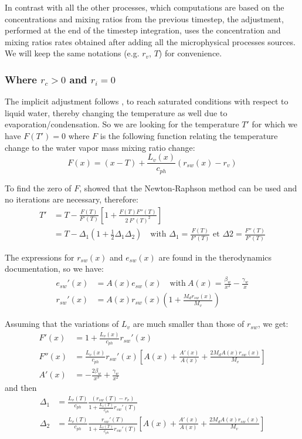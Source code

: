 In contrast with all the other processes, which computations are based on the concentrations and mixing ratios from the previous timestep, the adjustment, performed at the end of the timestep integration, uses the concentration and mixing ratios rates obtained after adding all the microphysical processes sources. We will keep the same notations (e.g. $r_v$, $T$) for convenience.

\subsubsection{Where $r_c>0$ and $r_i=0$}

The implicit adjustment follows \citet{Langlois1973}, to reach saturated conditions with respect to liquid water, thereby changing the temperature as well due to evaporation/condensation. So we are looking for the temperature $T'$ for which we have $F(T')=0$ where $F$ is the following function relating the temperature change to the water vapor mass mixing ratio change:
\begin{equation}
 F(x) = (x-T) + \frac{L_v(x)}{c_{ph}} (r_{sw}(x)-r_v)
\end{equation}

To find the zero of $F$, \citet{Langlois1973} showed that the Newton-Raphson method can be used and no iterations are necessary, therefore:
\begin{align}
 T' &= T - \frac{F(T)}{F'(T)} [1 + \frac{F(T) F''(T)}{2 ~ F'(T)^2} ] \\
 &= T - \Delta_1 \left( 1 + \frac{1}{2} \Delta_1 \Delta_2 \right) \quad \text{with } \Delta_1 = \frac{F(T)}{F'(T)} \text{ et } \Delta2 = \frac{F''(T)}{F'(T)}
\end{align}

The expressions for $r_{sw}(x)$ and $e_{sw}(x)$ are found in the therodynamics documentation, so we have:
\begin{align}
 e_{sw}'(x) &= A(x) e_{sw}(x) \quad \mathrm{with~} A(x) = \frac{\beta_w}{x^2} - \frac{\gamma_w}{x} \\
 r_{sw}'(x) &= A(x) r_{sw}(x) (1 + \frac{M_d r_{sw}(x)}{M_v} )
\end{align}

Assuming that the variations of $L_v$ are much smaller than those of $r_{sw}$, we get:
\begin{align}
 F'(x) &= 1 + \frac{L_v(x)}{c_{ph}} r_{sw}'(x) \\
 F''(x) &= \frac{L_v(x)}{c_{ph}} r_{sw}'(x) \left[ A(x) + \frac{A'(x)}{A(x)} + \frac{2 M_d A(x) r_{sw}(x)}{M_v} \right] \\
 A'(x) &= - \frac{2 \beta_w}{x^3} + \frac{\gamma_w}{x^2}
\end{align}
and then
\begin{align}
 \Delta_1 &= \frac{L_v(T)}{c_{ph}} \frac{(r_{sw}(T)-r_v)}{1 + \frac{L_v(T)}{c_{ph}} r_{sw}'(T)} \\
 \Delta_2 &= \frac{L_v(T)}{c_{ph}} \frac{r_{sw}'(T)}{1 + \frac{L_v(T)}{c_{ph}} r_{sw}'(T)} \left[ A(x) + \frac{A'(x)}{A(x)} + \frac{2 M_d A(x) r_{sw}(x)}{M_v} \right]
\end{align}

